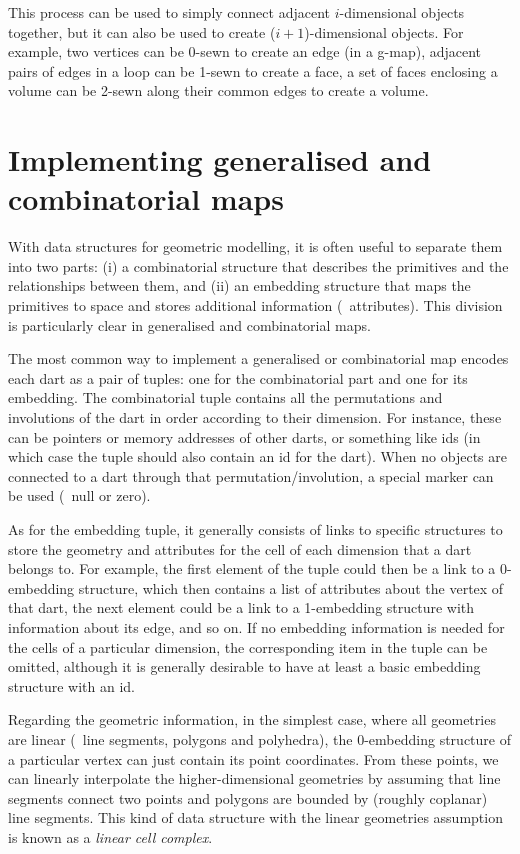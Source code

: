 This process can be used to simply connect adjacent \(i\)-dimensional objects together, but it can also be used to create (\(i+1\))-dimensional objects.
For example, two vertices can be 0-sewn to create an edge (in a g-map), adjacent pairs of edges in a loop can be 1-sewn to create a face, a set of faces enclosing a volume can be 2-sewn along their common edges to create a volume.

\section{Implementing generalised and combinatorial maps}

With data structures for geometric modelling, it is often useful to separate them into two parts: (i) a combinatorial structure that describes the primitives and the relationships between them, and (ii) an embedding structure that maps the primitives to space and stores additional information (\eg\ attributes).
This division is particularly clear in generalised and combinatorial maps.

The most common way to implement a generalised or combinatorial map encodes each dart as a pair of tuples: one for the combinatorial part and one for its embedding.
The combinatorial tuple contains all the permutations and involutions of the dart in order according to their dimension.
For instance, these can be pointers or memory addresses of other darts, or something like ids (in which case the tuple should also contain an id for the dart).
When no objects are connected to a dart through that permutation/involution, a special marker can be used (\eg\ null or zero).

As for the embedding tuple, it generally consists of links to specific structures to store the geometry and attributes for the cell of each dimension that a dart belongs to.
For example, the first element of the tuple could then be a link to a 0-embedding structure, which then contains a list of attributes about the vertex of that dart, the next element could be a link to a 1-embedding structure with information about its edge, and so on.
If no embedding information is needed for the cells of a particular dimension, the corresponding item in the tuple can be omitted, although it is generally desirable to have at least a basic embedding structure with an id.

Regarding the geometric information, in the simplest case, where all geometries are linear (\ie\ line segments, polygons and polyhedra), the 0-embedding structure of a particular vertex can just contain its point coordinates.
From these points, we can linearly interpolate the higher-dimensional geometries by assuming that line segments connect two points and polygons are bounded by (roughly coplanar) line segments.
This kind of data structure with the linear geometries assumption is known as a \emph{linear cell complex}.

